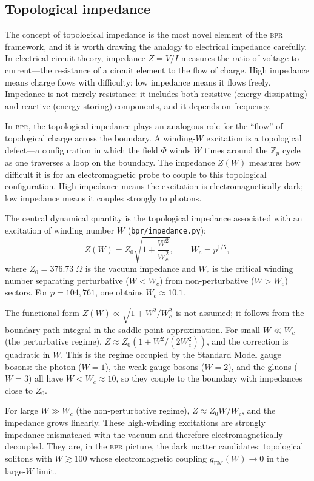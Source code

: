 \documentclass[aps,prd,twocolumn,superscriptaddress,longbibliography,nofootinbib]{revtex4-2}
\newcommand{\Zp}{\mathbb{Z}_p}
\newcommand{\Wc}{W_{\!c}}
\newcommand{\Zimp}{Z}
\newcommand{\Zvac}{Z_0}
\newcommand{\bpr}{\textsc{bpr}}
\begin{document}
\subsection{Topological impedance}

The concept of topological impedance is the most novel element of the
\bpr{} framework, and it is worth drawing the analogy to electrical
impedance carefully.  In electrical circuit theory, impedance
$Z = V/I$ measures the ratio of voltage to current---the resistance
of a circuit element to the flow of charge.  High impedance means
charge flows with difficulty; low impedance means it flows freely.
Impedance is not merely resistance: it includes both resistive
(energy-dissipating) and reactive (energy-storing) components, and
it depends on frequency.

In \bpr{}, the topological impedance plays an analogous role for the
``flow'' of topological charge across the boundary.  A winding-$W$
excitation is a topological defect---a configuration in which the
field $\Phi$ winds $W$ times around the $\Zp$ cycle as one traverses
a loop on the boundary.  The impedance $\Zimp(W)$ measures how
difficult it is for an electromagnetic probe to couple to this
topological configuration.  High impedance means the excitation is
electromagnetically dark; low impedance means it couples strongly to
photons.

The central dynamical quantity is the topological impedance
associated with an excitation of winding number $W$
(\texttt{bpr/impedance.py}):
\begin{equation}
\Zimp(W) = \Zvac \sqrt{1 + \frac{W^2}{\Wc^2}},
\qquad \Wc = p^{1/5},
\label{eq:impedance}
\end{equation}
where $\Zvac = 376.73\;\Omega$ is the vacuum impedance and
$\Wc$ is the critical winding number separating perturbative
($W < \Wc$) from non-perturbative ($W > \Wc$) sectors.  For
$p = 104{,}761$, one obtains $\Wc \approx 10.1$.

The functional form $\Zimp(W) \propto \sqrt{1 + W^2/\Wc^2}$ is not
assumed; it follows from the boundary path integral in the
saddle-point approximation.  For small $W \ll \Wc$ (the perturbative
regime), $\Zimp \approx \Zvac(1 + W^2/(2\Wc^2))$, and the correction
is quadratic in $W$.  This is the regime occupied by the Standard
Model gauge bosons: the photon ($W = 1$), the weak gauge bosons
($W = 2$), and the gluons ($W = 3$) all have $W < \Wc \approx 10$,
so they couple to the boundary with impedances close to $\Zvac$.

For large $W \gg \Wc$ (the non-perturbative regime),
$\Zimp \approx \Zvac W/\Wc$, and the impedance grows linearly.
These high-winding excitations are strongly impedance-mismatched with
the vacuum and therefore electromagnetically decoupled.  They are, in
the \bpr{} picture, the dark matter candidates: topological solitons
with $W \gtrsim 100$ whose electromagnetic coupling
$g_{\mathrm{EM}}(W) \to 0$ in the large-$W$ limit.
\end{document}

